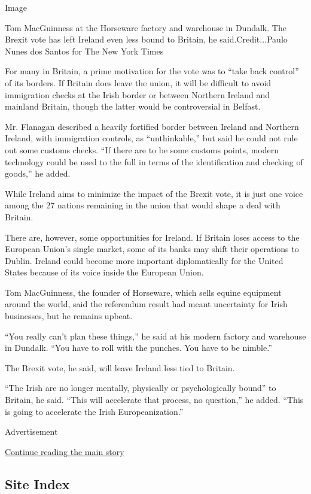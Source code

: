 Image

Tom MacGuinness at the Horseware factory and warehouse in Dundalk. The
Brexit vote has left Ireland even less bound to Britain, he
said.Credit...Paulo Nunes dos Santos for The New York Times

For many in Britain, a prime motivation for the vote was to ``take back
control'' of its borders. If Britain does leave the union, it will be
difficult to avoid immigration checks at the Irish border or between
Northern Ireland and mainland Britain, though the latter would be
controversial in Belfast.

Mr. Flanagan described a heavily fortified border between Ireland and
Northern Ireland, with immigration controls, as ``unthinkable,'' but
said he could not rule out some customs checks. ``If there are to be
some customs points, modern technology could be used to the full in
terms of the identification and checking of goods,'' he added.

While Ireland aims to minimize the impact of the Brexit vote, it is just
one voice among the 27 nations remaining in the union that would shape a
deal with Britain.

There are, however, some opportunities for Ireland. If Britain loses
access to the European Union's single market, some of its banks may
shift their operations to Dublin. Ireland could become more important
diplomatically for the United States because of its voice inside the
European Union.

Tom MacGuinness, the founder of Horseware, which sells equine equipment
around the world, said the referendum result had meant uncertainty for
Irish businesses, but he remains upbeat.

``You really can't plan these things,'' he said at his modern factory
and warehouse in Dundalk. ``You have to roll with the punches. You have
to be nimble.''

The Brexit vote, he said, will leave Ireland less tied to Britain.

``The Irish are no longer mentally, physically or psychologically
bound'' to Britain, he said. ``This will accelerate that process, no
question,'' he added. ``This is going to accelerate the Irish
Europeanization.''

Advertisement

\protect\hyperlink{after-bottom}{Continue reading the main story}

\hypertarget{site-index}{%
\subsection{Site Index}\label{site-index}}

